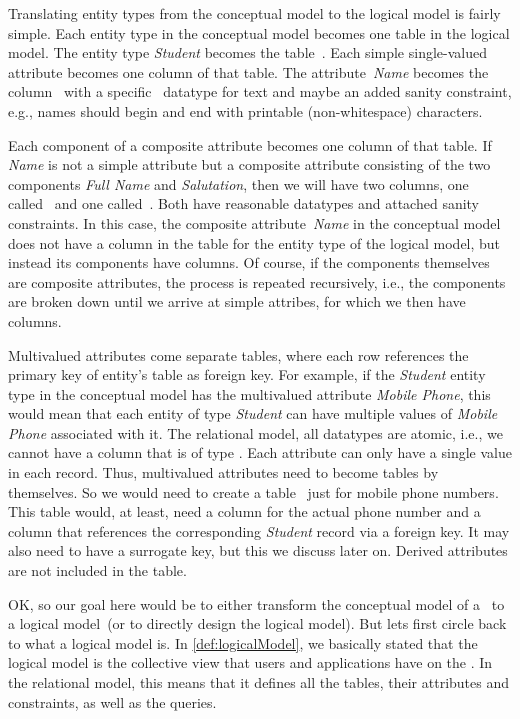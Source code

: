 %
\label{sec:mappingEntitiesToTables}%
%
Translating entity types from the conceptual model to the logical model is fairly simple.
Each entity type in the conceptual model becomes one table in the logical model.
The entity type \emph{Student} becomes the table~.
Each simple single-valued attribute becomes one column of that table.
The attribute~\emph{Name} becomes the column~ with a specific \sql~datatype for text and maybe an added sanity constraint, e.g., names should begin and end with printable (non-whitespace) characters.

Each component of a composite attribute becomes one column of that table.
If \emph{Name} is not a simple attribute but a composite attribute consisting of the two components \emph{Full Name} and \emph{Salutation}, then we will have two columns, one called~ and one called~.
Both have reasonable datatypes and attached sanity constraints.
In this case, the composite attribute~\emph{Name} in the conceptual model does not have a column in the table for the entity type of the logical model, but instead its components have columns.
Of course, if the components themselves are composite attributes, the process is repeated recursively, i.e., the components are broken down until we arrive at simple attribes, for which we then have columns.

Multivalued attributes come separate tables, where each row references the primary key of entity's table as foreign key.
For example, if the \emph{Student} entity type in the conceptual model has the multivalued attribute \emph{Mobile Phone}, this would mean that each entity of type \emph{Student} can have multiple values of \emph{Mobile Phone} associated with it.
The relational model, all datatypes are atomic, i.e., we cannot have a column that is of type .
Each attribute can only have a single value in each record.
Thus, multivalued attributes need to become tables by themselves.
So we would need to create a table~ just for mobile phone numbers.
This table would, at least, need a column for the actual phone number and a column that references the corresponding \emph{Student} record via a foreign key.
It may also need to have a surrogate key, but this we discuss later on.
Derived attributes are not included in the table.

OK, so our goal here would be to either transform the conceptual model of a \db\ to a logical model~(or to directly design the logical model).
But lets first circle back to what a logical model is.
In \cref{def:logicalModel}, we basically stated that the logical model is the collective view that users and applications have on the \db.
In the relational model, this means that it defines all the tables, their attributes and constraints, as well as the queries.

